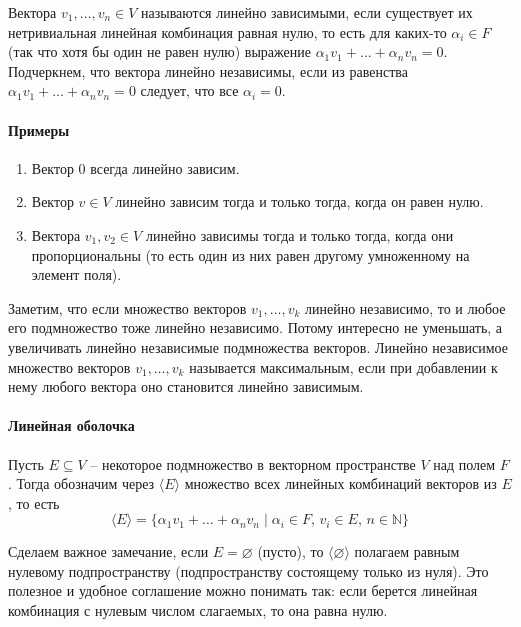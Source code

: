 \begin{definition}
Вектора $v_1,\ldots,v_n\in V$ называются линейно зависимыми, если существует их нетривиальная линейная комбинация равная нулю, то есть для каких-то $\alpha_i\in F$ (так что хотя бы один не равен нулю) выражение $\alpha_1 v_1+\ldots + \alpha_n v_n = 0$.
Подчеркнем, что вектора линейно независимы, если из равенства $\alpha_1 v_1 + \ldots + \alpha_n v_n = 0$ следует, что все $\alpha_i = 0$.
\end{definition}

\paragraph{Примеры}

\begin{enumerate}
\item Вектор $0$ всегда линейно зависим.

\item Вектор $v\in V$ линейно зависим тогда и только тогда, когда он равен нулю.

\item Вектора $v_1, v_2 \in V$ линейно зависимы тогда и только тогда, когда они пропорциональны (то есть один из них равен другому умноженному на элемент поля).
\end{enumerate}

Заметим, что если множество векторов $v_1,\ldots, v_k$ линейно независимо, то и любое его подмножество тоже линейно независимо.
Потому интересно не уменьшать, а увеличивать линейно независимые подмножества векторов.
Линейно независимое множество векторов $v_1,\ldots, v_k$ называется максимальным, если при добавлении к нему любого вектора оно становится линейно зависимым.

\paragraph{Линейная оболочка}

\begin{definition}
Пусть $E\subseteq V$ -- некоторое подмножество в векторном пространстве $V$ над полем $F$.
Тогда обозначим через $\langle E \rangle$ множество всех линейных комбинаций векторов из $E$, то есть
\[
\langle E \rangle = \{\alpha_1 v_1 + \ldots + \alpha_n v_n \mid \alpha_i\in F,\, v_i \in E,\, n\in\mathbb N\}
\]
\end{definition}

Сделаем важное замечание, если $E = \varnothing$ (пусто), то $\langle \varnothing \rangle$ полагаем равным нулевому подпространству (подпространству состоящему только из нуля).
Это полезное и удобное соглашение можно понимать так: если берется линейная комбинация с нулевым числом слагаемых, то она равна нулю.

